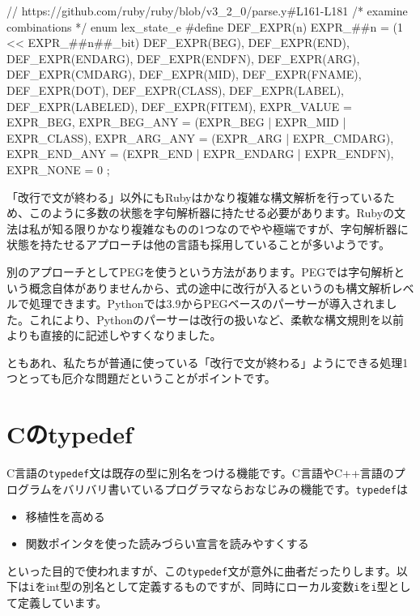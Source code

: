 \begin{codescreen}{}
// https://github.com/ruby/ruby/blob/v3_2_0/parse.y#L161-L181
/* examine combinations */
enum lex_state_e {
#define DEF_EXPR(n) EXPR_##n = (1 << EXPR_##n##_bit)
    DEF_EXPR(BEG),
    DEF_EXPR(END),
    DEF_EXPR(ENDARG),
    DEF_EXPR(ENDFN),
    DEF_EXPR(ARG),
    DEF_EXPR(CMDARG),
    DEF_EXPR(MID),
    DEF_EXPR(FNAME),
    DEF_EXPR(DOT),
    DEF_EXPR(CLASS),
    DEF_EXPR(LABEL),
    DEF_EXPR(LABELED),
    DEF_EXPR(FITEM),
    EXPR_VALUE = EXPR_BEG,
    EXPR_BEG_ANY  =  (EXPR_BEG | EXPR_MID | EXPR_CLASS),
    EXPR_ARG_ANY  =  (EXPR_ARG | EXPR_CMDARG),
    EXPR_END_ANY  =  (EXPR_END | EXPR_ENDARG | EXPR_ENDFN),
    EXPR_NONE = 0
};
\end{codescreen}

「改行で文が終わる」以外にもRubyはかなり複雑な構文解析を行っているため、このように多数の状態を字句解析器に持たせる必要があります。Rubyの文法は私が知る限りかなり複雑なものの1つなのでやや極端ですが、字句解析器に状態を持たせるアプローチは他の言語も採用していることが多いようです。

別のアプローチとしてPEGを使うという方法があります。PEGでは字句解析という概念自体がありませんから、式の途中に改行が入るというのも構文解析レベルで処理できます。Pythonでは3.9からPEGベースのパーサーが導入されました。これにより、Pythonのパーサーは改行の扱いなど、柔軟な構文規則を以前よりも直接的に記述しやすくなりました。

ともあれ、私たちが普通に使っている「改行で文が終わる」ようにできる処理1つとっても厄介な問題だということがポイントです。

\section{Cのtypedef}

C言語の\texttt{typedef}文は既存の型に別名をつける機能です。C言語やC++言語のプログラムをバリバリ書いているプログラマならおなじみの機能です。\texttt{typedef}は

\begin{itemize}
\item
  移植性を高める
\item
  関数ポインタを使った読みづらい宣言を読みやすくする
\end{itemize}

\noindent といった目的で使われますが、この\texttt{typedef}文が意外に曲者だったりします。以下は\texttt{i}をint型の別名として定義するものですが、同時にローカル変数\texttt{i}を\texttt{i}型として定義しています。

